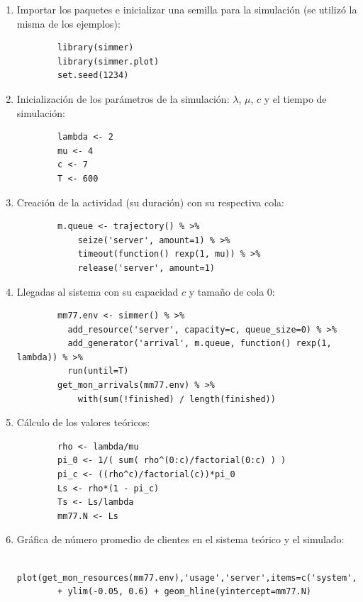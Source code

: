 \begin{enumerate}
    \item Importar los paquetes e inicializar una semilla para la simulación (se utilizó la misma de los ejemplos): 
        \begin{lstlisting}
        library(simmer)
        library(simmer.plot)
        set.seed(1234)
        \end{lstlisting}
    \item Inicialización de los parámetros de la simulación: $\lambda$, $\mu$, $c$ y el tiempo de simulación:
        \begin{lstlisting}
        lambda <- 2
        mu <- 4
        c <- 7
        T <- 600
        \end{lstlisting}
    \item Creación de la actividad (su duración) con su respectiva cola:
        \begin{lstlisting}
        m.queue <- trajectory() % >%
            seize('server', amount=1) % >%
            timeout(function() rexp(1, mu)) % >%
            release('server', amount=1)
        \end{lstlisting}
    \item Llegadas al sistema con su capacidad $c$ y tamaño de cola 0:
        \begin{lstlisting}
        mm77.env <- simmer() % >%
          add_resource('server', capacity=c, queue_size=0) % >%
          add_generator('arrival', m.queue, function() rexp(1, lambda)) % >%
          run(until=T)
        get_mon_arrivals(mm77.env) % >%
            with(sum(!finished) / length(finished))
        \end{lstlisting}
    \item Cálculo de los valores teóricos:
        \begin{lstlisting}
        rho <- lambda/mu
        pi_0 <- 1/( sum( rho^(0:c)/factorial(0:c) ) )
        pi_c <- ((rho^c)/factorial(c))*pi_0
        Ls <- rho*(1 - pi_c)
        Ts <- Ls/lambda
        mm77.N <- Ls
        \end{lstlisting}
    \item Gráfica de número promedio de clientes en el sistema teórico y el simulado:
        \begin{lstlisting}
        plot(get_mon_resources(mm77.env),'usage','server',items=c('system','queue')) 
        + ylim(-0.05, 0.6) + geom_hline(yintercept=mm77.N)
        \end{lstlisting}
\end{enumerate}

